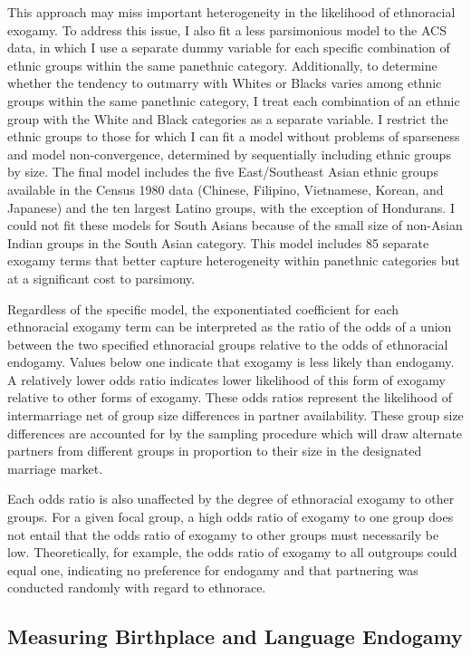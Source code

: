 \documentclass[11pt,]{article}
\begin{document}
This approach may miss important heterogeneity in the likelihood of ethnoracial exogamy. To address this issue, I also fit a less parsimonious model to the ACS data, in which I use a separate dummy variable for each specific combination of ethnic groups within the same panethnic category. Additionally, to determine whether the tendency to outmarry with Whites or Blacks varies among ethnic groups within the same panethnic category, I treat each combination of an ethnic group with the White and Black categories as a separate variable. I restrict the ethnic groups to those for which I can fit a model without problems of sparseness and model non-convergence, determined by sequentially including ethnic groups by size. The final model includes the five East/Southeast Asian ethnic groups available in the Census 1980 data (Chinese, Filipino, Vietnamese, Korean, and Japanese) and the ten largest Latino groups, with the exception of Hondurans. I could not fit these models for South Asians because of the small size of non-Asian Indian groups in the South Asian category. This model includes 85 separate exogamy terms that better capture heterogeneity within panethnic categories but at a significant cost to parsimony.

Regardless of the specific model, the exponentiated coefficient for each ethnoracial exogamy term can be interpreted as the ratio of the odds of a union between the two specified ethnoracial groups relative to the odds of ethnoracial endogamy. Values below one indicate that exogamy is less likely than endogamy. A relatively lower odds ratio indicates lower likelihood of this form of exogamy relative to other forms of exogamy. These odds ratios represent the likelihood of intermarriage net of group size differences in partner availability. These group size differences are accounted for by the sampling procedure which will draw alternate partners from different groups in proportion to their size in the designated marriage market.

Each odds ratio is also unaffected by the degree of ethnoracial exogamy to other groups. For a given focal group, a high odds ratio of exogamy to one group does not entail that the odds ratio of exogamy to other groups must necessarily be low. Theoretically, for example, the odds ratio of exogamy to all outgroups could equal one, indicating no preference for endogamy and that partnering was conducted randomly with regard to ethnorace.

\hypertarget{measuring-birthplace-and-language-endogamy}{%
\subsection{Measuring Birthplace and Language Endogamy}\label{measuring-birthplace-and-language-endogamy}}
\end{document}

